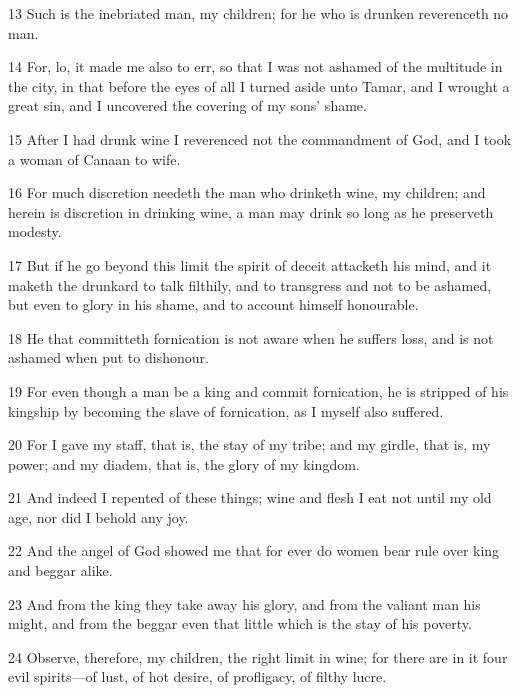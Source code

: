 \par 13 Such is the inebriated man, my children; for he who is drunken reverenceth no man.

\par 14 For, lo, it made me also to err, so that I was not ashamed of the multitude in the city, in that before the eyes of all I turned aside unto Tamar, and I wrought a great sin, and I uncovered the covering of my sons' shame.

\par 15 After I had drunk wine I reverenced not the commandment of God, and I took a woman of Canaan to wife.

\par 16 For much discretion needeth the man who drinketh wine, my children; and herein is discretion in drinking wine, a man may drink so long as he preserveth modesty.

\par 17 But if he go beyond this limit the spirit of deceit attacketh his mind, and it maketh the drunkard to talk filthily, and to transgress and not to be ashamed, but even to glory in his shame, and to account himself honourable.

\par 18 He that committeth fornication is not aware when he suffers loss, and is not ashamed when put to dishonour.

\par 19 For even though a man be a king and commit fornication, he is stripped of his kingship by becoming the slave of fornication, as I myself also suffered.

\par 20 For I gave my staff, that is, the stay of my tribe; and my girdle, that is, my power; and my diadem, that is, the glory of my kingdom.

\par 21 And indeed I repented of these things; wine and flesh I eat not until my old age, nor did I behold any joy.

\par 22 And the angel of God showed me that for ever do women bear rule over king and beggar alike.

\par 23 And from the king they take away his glory, and from the valiant man his might, and from the beggar even that little which is the stay of his poverty.

\par 24 Observe, therefore, my children, the right limit in wine; for there are in it four evil spirits—of lust, of hot desire, of profligacy, of filthy lucre.


